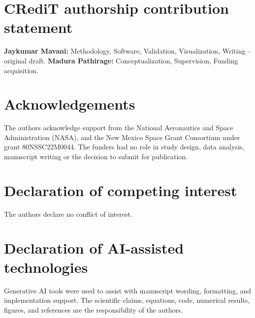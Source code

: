 \documentclass[preprint,11pt,a4paper]{elsarticle}
\begin{document}
\section*{CRediT authorship contribution statement}

\textbf{Jaykumar Mavani:} Methodology, Software, Validation,
Visualization, Writing -- original draft.
\textbf{Madura Pathirage:} Conceptualization, Supervision, Funding
acquisition.

\section*{Acknowledgements}

The authors acknowledge support from the National Aeronautics and Space
Administration (NASA), and the New Mexico Space Grant Consortium under
grant 80NSSC22M0044. The funders had no role in study design, data
analysis, manuscript writing or the decision to submit for publication.

\section*{Declaration of competing interest}

The authors declare no conflict of interest.

\section*{Declaration of AI-assisted technologies}

Generative AI tools were used to assist with manuscript wording, formatting, and implementation support. The scientific claims, equations, code, numerical results, figures, and references are the responsibility of the authors.
\end{document}
